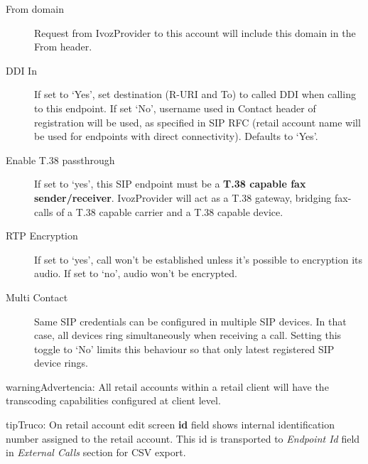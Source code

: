 \documentclass[letterpaper,10pt,spanish]{sphinxmanual}
\begin{document}
\begin{description}
\item[{From domain}] \leavevmode{}\label{administration_portal/client/retail/retail_accounts:term-from-domain}
Request from IvozProvider to this account will include this domain in
the From header.

\item[{DDI In}] \leavevmode{}\label{administration_portal/client/retail/retail_accounts:term-ddi-in}
If set to `Yes', set destination (R-URI and To) to called DDI when calling to this endpoint. If set `No', username
used in Contact header of registration will be used, as specified in SIP RFC (retail account name will be used for
endpoints with direct connectivity). Defaults to `Yes'.

\item[{Enable T.38 passthrough}] \leavevmode{}\label{administration_portal/client/retail/retail_accounts:term-enable-t-38-passthrough}
If set to `yes', this SIP endpoint must be a \textbf{T.38 capable fax sender/receiver}. IvozProvider
will act as a T.38 gateway, bridging fax-calls of a T.38 capable carrier and a T.38 capable device.

\item[{RTP Encryption}] \leavevmode{}\label{administration_portal/client/retail/retail_accounts:term-rtp-encryption}
If set to `yes', call won't be established unless it's possible to encryption its audio. If set to `no',
audio won't be encrypted.

\item[{Multi Contact}] \leavevmode{}\label{administration_portal/client/retail/retail_accounts:term-multi-contact}
Same SIP credentials can be configured in multiple SIP devices. In that case, all devices ring
simultaneously when receiving a call. Setting this toggle to `No' limits this behaviour so that
only latest registered SIP device rings.

\end{description}

\begin{notice}{warning}{Advertencia:}
All retail accounts within a retail client will have the transcoding capabilities configured at client level.
\end{notice}

\begin{notice}{tip}{Truco:}
On retail account edit screen \textbf{id} field shows internal identification number assigned to the retail account.
This id is transported to \emph{Endpoint Id} field in \emph{External Calls} section for CSV export.
\end{notice}
\end{document}
